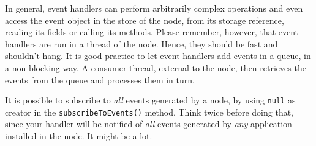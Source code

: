 In general, event handlers can perform arbitrarily complex operations and even access the
event object in the store of the node,
from its storage reference, reading its fields or calling its methods. Please remember, however,
that event handlers are run in a thread of the node. Hence, they should be fast and shouldn't hang.
It is good practice to let event handlers add events in a queue, in a non-blocking way.
A consumer thread, external to the node, then retrieves the events from the queue and processes them in turn.

It is possible to subscribe to \emph{all} events generated by a node,
by using \texttt{null} as creator in the \texttt{subscribeToEvents()} method. Think twice before doing that,
since your handler will be notified of \emph{all} events generated by \emph{any} application installed in
the node. It might be a lot.